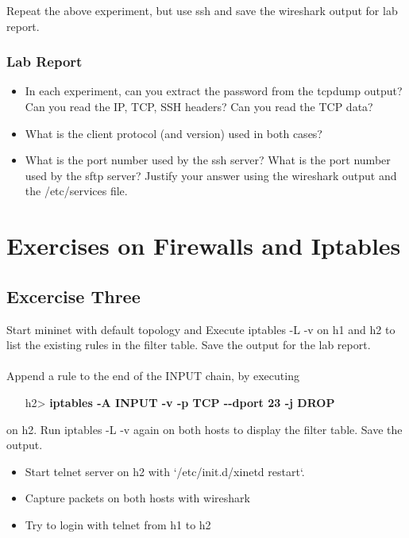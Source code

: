 \documentclass[10pt,a4paper]{article}
\numberwithin{equation}{section}
\numberwithin{figure}{section}
\numberwithin{table}{section}
\begin{document}
Repeat the above experiment, but use ssh and save the wireshark output for lab report.

\subsubsection*{ Lab Report}
\begin{itemize}
	\setlength{\itemindent}{0pt}
	\item In each experiment, can you extract the password from the tcpdump output? Can you read the IP, TCP, SSH headers? Can you read the TCP data?
	\item What is the client protocol (and version) used in both cases?
	\item What is the port number used by the ssh server? What is the port number used by the sftp server? Justify your answer using the wireshark output and the /etc/services file.
\end{itemize}

    \pagebreak

\section{Exercises on Firewalls and Iptables}
\subsection*{Excercise Three}
Start mininet with default topology and Execute iptables -L -v on h1 and h2 to list the existing rules in the filter table. Save the output for the lab report.\\
\\
 Append a rule to the end of the INPUT chain, by executing

\begin{itemize}
	\setlength{\itemindent}{10pt}
	\item [h2>] \textbf{iptables -A INPUT -v -p TCP {-}{-}dport 23 -j DROP} 
\end{itemize}

\setlength{\parindent}{0pt}
on h2. Run iptables -L -v again on both hosts to display the filter table. Save the output.\\


\begin{itemize}
	\setlength{\itemindent}{0pt}
	\item Start telnet server on h2 with `/etc/init.d/xinetd restart`.
	\item Capture packets on both hosts with wireshark
	\item Try to login with telnet from h1 to h2
\end{itemize}
\end{document}
